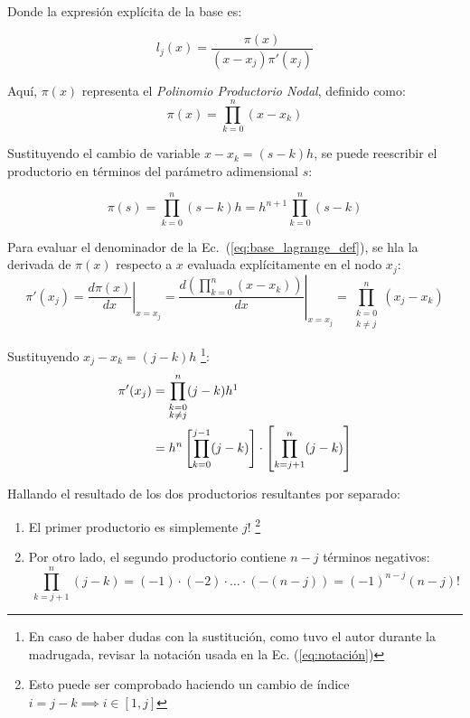 \documentclass[11pt, a4paper]{article}
\begin{document}
	Donde la expresión explícita de la base es:
	
	\begin{equation}
		l_j(x) = \frac{\pi(x)}{(x - x_j) \pi'(x_j)}
		\label{eq:base_lagrange_def}
	\end{equation}
	
	Aquí, $\pi(x)$ representa el \textit{Polinomio Productorio Nodal}, definido como:
	\begin{equation}
		\pi(x) = \prod_{k=0}^{n} (x - x_k)
	\end{equation}
	
	Sustituyendo el cambio de variable $x - x_k = (s - k)h$, se puede reescribir el productorio en términos del parámetro adimensional $s$:
	
	\begin{equation}
		\pi(s) = \prod_{k=0}^{n} (s - k)h = h^{n+1} \prod_{k=0}^{n} (s - k)
		\label{eq:productorio_s}
	\end{equation}
	
	Para evaluar el denominador de la Ec.~(\ref{eq:base_lagrange_def}), se hla la derivada de $\pi(x)$ respecto a $x$ evaluada explícitamente en el nodo $x_j$:
	\begin{equation}
		\pi'(x_j) = \left. \frac{d\pi(x)}{dx} \right|_{x=x_j} = \left. \frac{ d \left( \prod_{k=0}^{n} (x - x_k) \right) }{dx} \right|_{x=x_j} = \prod_{\substack{k=0 \\ k \neq j}}^{n} (x_j - x_k)
	\end{equation}
	
	Sustituyendo $x_j - x_k = (j - k)h$ \footnote{En caso de haber dudas con la sustitución, como tuvo el autor durante la madrugada, revisar la notación usada en la Ec. (\ref{eq:notación})}:
	\begin{align}
		\pi'(x_j) &= \prod_{\substack{k=0 \\ k \neq j}}^{n} (j - k)h \nonumber \footnotemark \\
		&= h^n \left[ \prod_{k=0}^{j-1} (j - k) \right] \cdot \left[ \prod_{k=j+1}^{n} (j - k) \right]
	\end{align}
	
	
	Hallando el resultado de los dos productorios resultantes por separado:
	\begin{enumerate}
		\item El primer productorio es simplemente $j!$ \footnote{Esto puede ser comprobado haciendo un cambio de índice $i = j - k \implies i \in [1, j]$}
		\item Por otro lado, el segundo productorio contiene $n-j$ términos negativos:
		\begin{equation}
			\prod_{k=j+1}^{n} (j - k) = (-1) \cdot (-2) \cdot \dots \cdot (-(n-j)) = (-1)^{n-j} (n-j)!
		\end{equation}
	\end{enumerate}
	
\end{document}
